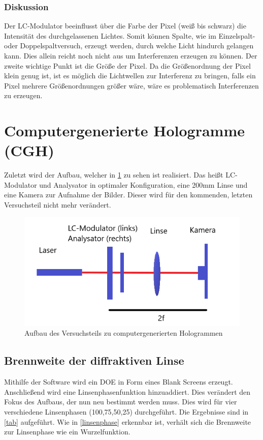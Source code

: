\subsubsection{Diskussion}
Der LC-Modulator beeinflusst über die Farbe der Pixel (weiß bis schwarz) die Intensität des durchgelassenen Lichtes. Somit können Spalte, wie im Einzelspalt- oder Doppelspaltversuch, erzeugt werden, durch welche Licht hindurch gelangen kann. Dies allein reicht noch nicht aus um Interferenzen erzeugen zu können. Der zweite wichtige Punkt ist die Größe der Pixel. Da die Größenordnung der Pixel klein genug ist, ist es möglich die Lichtwellen zur Interferenz zu bringen, falls ein Pixel mehrere Größenordnungen größer wäre, wäre es problematisch Interferenzen zu erzeugen.

\section{Computergenerierte Hologramme (CGH)}
Zuletzt wird der Aufbau, welcher in \cref{cghskizze} zu sehen ist realisiert. Das heißt LC-Modulator und Analysator in optimaler Konfiguration, eine 200mm Linse und eine Kamera zur Aufnahme der Bilder. Dieser wird für den kommenden, letzten Versuchsteil nicht mehr verändert.

\begin{figure}
	\centering
	\includegraphics[scale=1]{4.1.2-Aufbau2.png}
	\caption{Aufbau des Versuchsteils zu computergenerierten Hologrammen}
	\label{cghskizze}
\end{figure}

\subsection{Brennweite der diffraktiven Linse}
Mithilfe der Software wird ein DOE in Form eines Blank Screens erzeugt. Anschließend wird eine Linsenphasenfunktion hinzuaddiert. Dies verändert den Fokus des Aufbaus, der nun neu bestimmt werden muss. Dies wird für vier verschiedene Linsenphasen (100,75,50,25) durchgeführt. Die Ergebnisse sind in \cref{tab} aufgeführt. Wie in \cref{linsenphase} erkennbar ist, verhält sich die Brennweite zur Linsenphase wie ein Wurzelfunktion.

